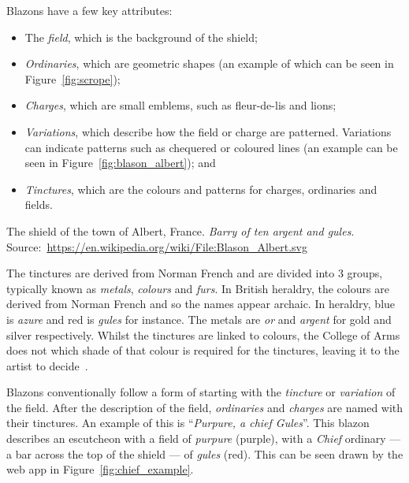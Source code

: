 \documentclass[nobib, a4paper, twoside, justified]{tufte-book}
\begin{document}
Blazons have a few key attributes:
\begin{itemize}
  \item The \textit{field}, which is the background of the shield;
  \item \textit{Ordinaries}, which are geometric shapes (an example of which can be seen in
    Figure~\ref{fig:scrope});
  \item \textit{Charges}, which are small emblems, such as fleur-de-lis and lions;
  \item \textit{Variations}, which describe how the field or charge are patterned. Variations can
    indicate patterns such as chequered or coloured lines (an example can be seen in
    Figure~\ref{fig:blason_albert}); and
  \item \textit{Tinctures}, which are the colours and patterns for charges, ordinaries and fields.
\end{itemize}

\begin{marginfigure}
  \centering
  \def\svgwidth{0.8\linewidth}
  
  \caption{The shield of the town of Albert, France. \textit{Barry of ten argent and
  gules}. Source:~\url{https://en.wikipedia.org/wiki/File:Blason_Albert.svg}}\label{fig:blason_albert}
\end{marginfigure}

The tinctures are derived from Norman French and are divided into 3 groups, typically known as
\textit{metals}, \textit{colours} and \textit{furs}. In British heraldry, the colours are derived
from Norman French and so the names appear archaic. In heraldry, blue is \textit{azure} and red is
\textit{gules} for instance. The metals are \textit{or} and \textit{argent} for gold and silver
respectively. Whilst the tinctures are linked to colours, the College of Arms does not which shade
of that colour is required for the tinctures, leaving it to the artist to
decide~\autocite{college_of_arms_faq}.

Blazons conventionally follow a form of starting with the \textit{tincture} or \textit{variation}
of the field. After the description of the field, \textit{ordinaries} and \textit{charges} are
named with their tinctures. An example of this is ``\textit{Purpure, a chief Gules}''. This blazon
describes an escutcheon with a field of \textit{purpure} (purple), with a \textit{Chief} ordinary
--- a bar across the top of the shield --- of \textit{gules} (red). This can be seen drawn by the
web app in Figure~\ref{fig:chief_example}.
\end{document}
